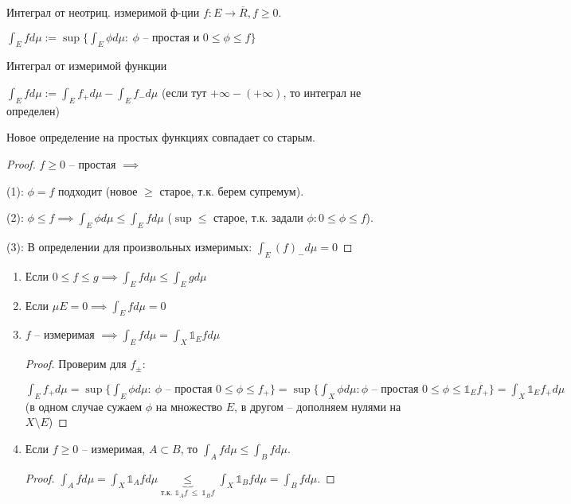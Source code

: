 \begin{definition}
    Интеграл от неотриц. измеримой ф-ции $f: E \to \overline{R}, f \geq 0$.

    $\int_E f d \mu := \sup \{ \int_E \phi d \mu : \ \phi \text{ -- простая и } 0 \leq \phi \leq f \}$
\end{definition}

\begin{definition}
    Интеграл от измеримой функции

    $\int_E f d \mu := \int_E f_+ d \mu - \int_E f_- d \mu$ (если тут $+\infty - (+\infty)$, то интеграл не определен)
\end{definition}

\begin{remark}
    Новое определение на простых функциях совпадает со старым.

    \begin{proof}
        $f \geq 0$ -- простая $ \implies$
        
        (1): $\phi = f$ подходит (новое $\geq$ старое, т.к. берем супремум).
    
        (2): $\phi \leq f \implies \int_E \phi d \mu \leq \int_E f d \mu$ ($\sup \leq$ старое, т.к. задали $\phi: 0 \leqslant \phi \leqslant f$).

        (3): В определении для произвольных измеримых: $\int_E (f)_{-}d\mu = 0$
    \end{proof}
\end{remark}

\begin{properties}
    \begin{enumerate}
        \item Если $0 \leq f \leq g \implies \int_E f d \mu \leq \int_E g d \mu$
        \item Если $\mu E = 0 \implies \int_E f d \mu = 0$
        \item {
            $f$ -- измеримая $\implies \int_E f d \mu = \int_X \mathds{1}_E f d \mu$ 

            \begin{proof}
                Проверим для $f_{\pm}$:
                
                $\int_E f_+ d \mu = \sup \{  \int_E \phi d \mu: \ \phi \text{ -- простая } 0 \leq \phi \leq f_+ \} = \sup \{ \int_X \phi d \mu: \phi \text{ -- простая } 0 \leq \phi \leq \mathds{1}_E f_+ \} = \int_X \mathds{1}_E f_+ d \mu$ (в одном случае сужаем $\phi$ на множество $E$, в другом -- дополняем нулями на $X \setminus E$)
            \end{proof}
        }
        \item {
            Если $f \geq 0$ -- измеримая, $A \subset B$, то $\int_A f d \mu \leq \int_B f d \mu$.

            \begin{proof}
                $\int_A f d \mu = \int_X \mathds{1}_A f d \mu \underbrace{\leq}_{\text{т.к. } \mathds{1}_A f \ \leq \ \mathds{1}_B f} \int_X \mathds{1}_B f d \mu = \int_B f d \mu$.
            \end{proof}
        }
    \end{enumerate}
\end{properties}

